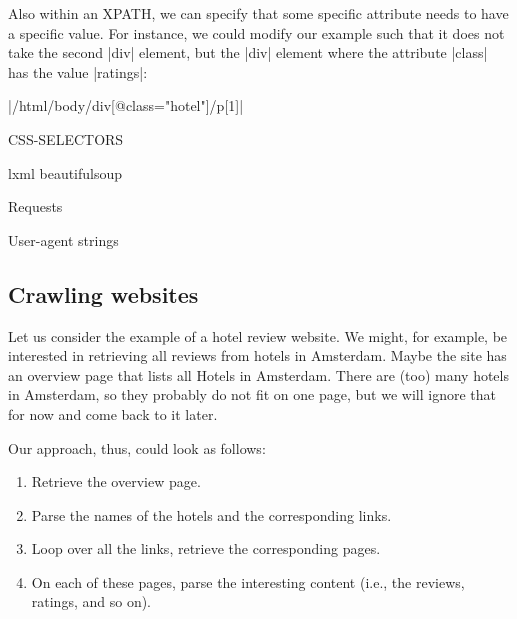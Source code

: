 Also within an XPATH, we can specify that some specific attribute needs to have a specific value. For instance, we could modify our example such that it does not take the second |div| element, but the |div| element where the attribute |class| has the value |ratings|:

|/html/body/div[@class="hotel"]/p[1]|

















CSS-SELECTORS



lxml
beautifulsoup




Requests

User-agent strings




\subsection{Crawling websites}

Let us consider the example of a hotel review website. We might, for example, be interested in retrieving all reviews from hotels in Amsterdam.
Maybe the site has an overview page that lists all Hotels in Amsterdam. There are (too) many hotels in Amsterdam, so they probably do not fit on one page, but we will ignore that for now and come back to it later. 

Our approach, thus, could look as follows:

\begin{enumerate}
	\item Retrieve the overview page.
	\item Parse the names of the hotels and the corresponding links.
	\item Loop over all the links, retrieve the corresponding pages.
	\item On each of these pages, parse the interesting content (i.e., the reviews, ratings, and so on).
\end{enumerate}



